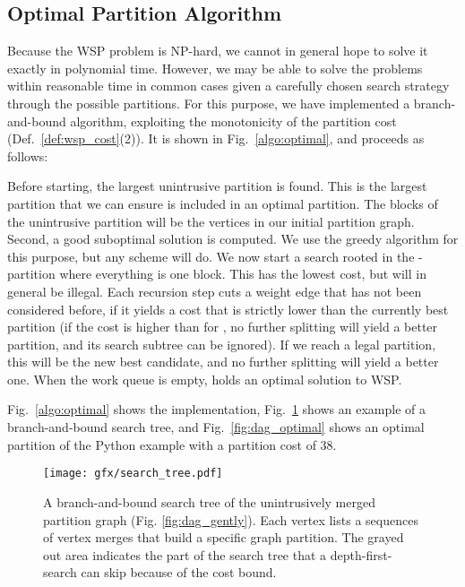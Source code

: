 \fi


\subsection{Optimal Partition Algorithm}
Because the WSP problem is NP-hard, we cannot in general hope to solve
it exactly in polynomial time. However, we may be able to solve the
problems within reasonable time in common cases given a carefully
chosen search strategy through the  possible partitions. For this
purpose, we have implemented a branch-and-bound algorithm,
exploiting the monotonicity of the partition cost (Def.~\ref{def:wsp_cost}(2)).
It is shown in Fig.~\ref{algo:optimal}, and proceeds as follows:

Before starting, the largest unintrusive partition is found. This is
the largest partition that we can ensure is included in an optimal
partition.  The blocks of the unintrusive partition will be the
vertices in our initial partition graph.  Second, a good suboptimal
solution is computed. We use the greedy algorithm for this purpose,
but any scheme will do.  We now start a search rooted in the
-partition where everything is one block. This has the lowest
cost, but will in general be illegal.  Each recursion step cuts a
weight edge that has not been considered before, if it yields a cost
that is strictly lower than the currently best partition 
(if the cost is higher than for , no further splitting will
yield a better partition, and its search subtree can be ignored). If
we reach a legal partition, this will be the new best candidate, and
no further splitting will yield a better one. When the work queue is
empty,  holds an optimal solution to WSP.

Fig.~\ref{algo:optimal} shows the implementation, Fig.~\ref{fig:search_tree} shows an example of a branch-and-bound search tree, and Fig.~\ref{fig:dag_optimal} shows an optimal partition of the Python example with a partition cost of 38.

\begin{figure}
 \centering
 \vspace{-10px}
 \texttt{[image: gfx/search\_tree.pdf]}
 \caption{A branch-and-bound search tree of the unintrusively merged
   partition graph (Fig. \ref{fig:dag_gently}). Each vertex lists a
   sequences of vertex merges that build a specific graph
   partition. The grayed out area indicates the part of the search
   tree that a depth-first-search can skip because of the cost
   bound. }
 \label{fig:search_tree}
\end{figure}

